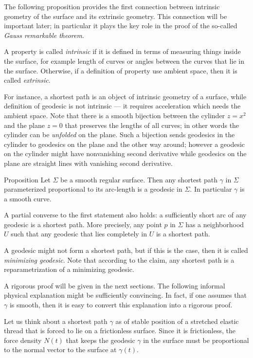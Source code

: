 The following proposition provides the first connection between intrinsic geometry of the surface and its extrinsic geometry.
This connection will be important later; in particular it plays the key role in the proof of the so-called \emph{Gauss remarkable theorem}.

A property is called \emph{intrinsic} if it is defined in terms of measuring things inside the surface, for example length of curves or angles between the curves that lie in the surface.
Otherwise, if a definition of property use ambient space, then it is called \emph{extrinsic}.

For instance, a shortest path is an object of intrinsic geometry of a surface,
while definition of geodesic is not intrinsic --- it requires acceleration which needs the ambient space.
Note that there is a smooth bijection between the cylinder $z=x^2$ and the plane $z=0$ that preserves the lengths of all curves; in other words the cylinder can be \emph{unfolded} on the plane.
Such a bijection sends geodesics in the cylinder to geodesics on the plane and the other way around; however a geodesic on the cylinder might have nonvanishing second derivative while geodesics on the plane are straight lines with vanishing second derivative.

\begin{thm}{Proposition}\label{prop:gamma''}
Let $\Sigma$ be a smooth regular surface.
Then any shortest path $\gamma$ in $\Sigma$ parameterized proportional to its arc-length is a geodesic in $\Sigma$.
In particular $\gamma$ is a smooth curve.

A partial converse to the first statement also holds: a sufficiently short arc of any geodesic is a shortest path.
More precisely, any point $p$ in $\Sigma$ has a neighborhood $U$ such that any geodesic that lies completely in $U$ is a shortest path.
\end{thm}

A geodesic might not form a shortest path, but if this is the case, then it is called \emph{minimizing geodesic}.
Note that according to the claim, any shortest path is a reparametrization of a minimizing geodesic.

A rigorous proof will be given in the next sections. 
The following informal physical explanation might be sufficiently convincing.
In fact, if one assumes that $\gamma$ is smooth, then it is easy to convert this explanation into a rigorous proof.

Let us think about a shortest path $\gamma$ as of stable position of a stretched elastic thread that is forced to lie on a frictionless surface.
Since it is frictionless, the force density $N(t)$ that keeps the geodesic $\gamma$ in the surface must be proportional to the normal vector to the surface at $\gamma(t)$.

